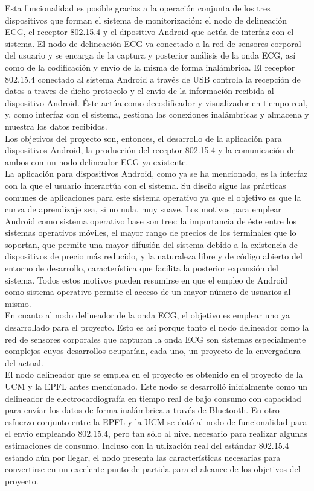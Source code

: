 	Esta funcionalidad es posible gracias a la operación conjunta de los tres dispositivos que forman el sistema de monitorización: el nodo de delineación ECG, el receptor 802.15.4 y el dipositivo Android que actúa de interfaz con el sistema. El nodo de delineación ECG va conectado a la red de sensores corporal del usuario y se encarga de la captura y posterior análisis de la onda ECG, así como de la codificación y envío de la misma de forma inalámbrica. El receptor 802.15.4 conectado al sistema Android a través de USB controla la recepción de datos a traves de dicho protocolo y el envío de la información recibida al dispositivo Android. Éste actúa como decodificador y visualizador en tiempo real, y, como interfaz con el sistema, gestiona las conexiones inalámbricas y almacena y muestra los datos recibidos.\\

	Los objetivos del proyecto son, entonces, el desarrollo de la aplicación para dispositivos Android, la producción del receptor 802.15.4 y la comunicación de ambos con un nodo delineador ECG ya existente.\\

	La aplicación para dispositivos Android, como ya se ha mencionado, es la interfaz con la que el usuario interactúa con el sistema. Su diseño sigue las prácticas comunes de aplicaciones para este sistema operativo ya que el objetivo es que la curva de aprendizaje sea, si no nula, muy suave. Los motivos para emplear Android como sistema operativo base son tres: la importancia de éste entre los sistemas operativos móviles, el mayor rango de precios de los terminales que lo soportan, que permite una mayor difusión del sistema debido a la existencia de dispositivos de precio más reducido, y la naturaleza libre y de código abierto del entorno de desarrollo, característica que facilita la posterior expansión del sistema. Todos estos motivos pueden resumirse en que el empleo de Android como sistema operativo permite el acceso de un mayor número de usuarios al mismo.\\

	En cuanto al nodo delineador de la onda ECG, el objetivo es emplear uno ya desarrollado para el proyecto. Esto es así porque tanto el nodo delineador como la red de sensores corporales que capturan la onda ECG son sistemas especialmente complejos cuyos desarrollos ocuparían, cada uno, un proyecto de la envergadura del actual.\\

	El nodo delineador que se emplea en el proyecto es obtenido en el proyecto de la UCM y la EPFL antes mencionado. Este nodo se desarrolló inicialmente como un delineador de electrocardiografía en tiempo real de bajo consumo con capacidad para envíar los datos de forma inalámbrica a través de Bluetooth. En otro esfuerzo conjunto entre la EPFL y la UCM se dotó al nodo de funcionalidad para el envío empleando 802.15.4, pero tan sólo al nivel necesario para realizar algunas estimaciones de consumo. Incluso con la utlización real del estándar 802.15.4 estando aún por llegar, el nodo presenta las características necesarias para convertirse en un excelente punto de partida para el alcance de los objetivos del proyecto.\\

